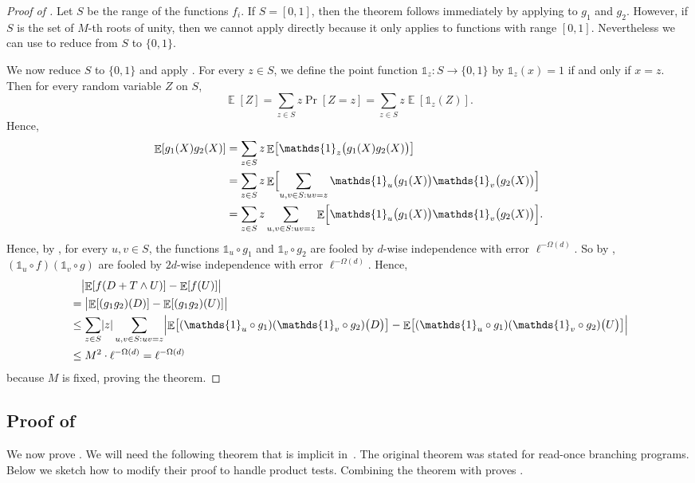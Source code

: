 \documentclass{toc}
\newcommand{\zo}{\{0,1\}}
\def\Blocklength{\ell}
\def\1{\mathds{1}}
\DeclarePairedDelimiter{\abs}{\lvert}{\rvert}
\DeclareMathOperator*{\E}{\mathbb{E}}                 %
\begin{document}
\begin{proof}[Proof of {}]
    Let $S$ be the range of the functions $f_i$.
    If $S = [0, 1]$, then the theorem follows immediately by applying  to $g_1$ and $g_2$.
    However, if $S$ is the set of $M$-th roots of unity, then we cannot apply  directly because it only applies to functions with range $[0, 1]$.
    Nevertheless we can use  to reduce from $S$ to $\zo$.

    We now reduce $S$ to $\zo$ and apply .
    For every $z \in S$, we define the point function $\1_z \colon S \to \zo$ by $\1_z(x) = 1$ if and only if $x = z$.
    Then for every random variable $Z$ on $S$,
    \[ \E[Z] = \sum_{z \in S} z \Pr[Z = z] = \sum_{z \in S} z \E[\1_z(Z)].\]
    Hence,
    \begin{align*}
      \E[g_1(X) g_2(X)]
      &= \sum_{z \in S} z \E \bigl[\1_z \bigl( g_1(X) g_2(X) \bigr) \bigr] \\
      &= \sum_{z \in S} z \E \Bigl[ \sum_{u,v \in S: uv = z} \1_u \bigl( g_1(X) \bigr) \1_v \bigl( g_2(X) \bigr) \Bigr] \\
      &= \sum_{z \in S} z \sum_{u,v \in S: uv = z} \E \Bigl[ \1_u \bigl( g_1(X) \bigr) \1_v \bigl( g_2(X) \bigr) \Bigr].
    \end{align*}
    Hence, by , for every $u,v \in S$, the functions $\1_u \circ g_1$ and $\1_v \circ g_2$ are fooled by $d$-wise independence with error $\Blocklength^{-\Omega(d)}$.
    So by , $(\1_u \circ f)(\1_v \circ g)$ are fooled by $2d$-wise independence with error $\Blocklength^{-\Omega(d)}$.
    Hence,
    \begin{align*}
      &\quad \bigl| \E[f(D + T \wedge U)] - \E[f(U)] \bigr| \\
      &= \bigl| \E[(g_1 g_2)(D)] - \E[(g_1 g_2)(U)] \bigr| \\
      &\le \sum_{z \in S} \abs{z} \sum_{u,v \in S: uv = z} \Bigl| \E \bigl[(\1_u \circ g_1)(\1_v \circ g_2) \bigl( D \bigr) \bigr] - \E \bigl[(\1_u \circ g_1)(\1_{v} \circ g_2) \bigl( U \bigr) \bigr] \Bigr| \\
      &\le M^2 \cdot \Blocklength^{-\Omega(d)} = \Blocklength^{-\Omega(d)}
    \end{align*}
    because $M$ is fixed, proving the theorem.
  \end{proof}

  
  \subsection{Proof of }
	We now prove .
	We will need the following theorem that is implicit in~\cite{ForbesK18}.
	The original theorem was stated for read-once branching programs.
	Below we sketch how to modify their proof to handle product tests.
	Combining the theorem with  proves .
\end{document}
